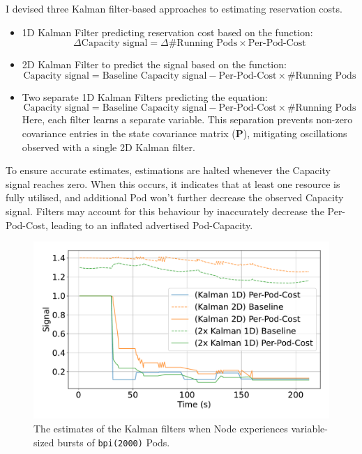 I devised three Kalman filter-based approaches to estimating reservation costs.
\begin{itemize}
    \item 1D Kalman Filter predicting reservation cost based on the function:
        \[\Delta \text{Capacity signal} = \Delta \text{\# Running Pods} \times
        \text{Per-Pod-Cost}\]
    \item 2D Kalman Filter to predict the signal based on the function:
        \[\text{Capacity signal} = \text{Baseline Capacity signal} - \text{Per-Pod-Cost}
        \times \text{\# Running Pods}\]
    \item Two separate 1D Kalman Filters predicting the equation:
        \[\text{Capacity signal} = \text{Baseline Capacity signal} -
        \text{Per-Pod-Cost} \times \text{\# Running Pods}\]
        Here, each filter learns a separate variable. This separation prevents
        non-zero covariance entries in the state covariance matrix ($\mathbf{P}$),
        mitigating oscillations observed with a single 2D Kalman filter.
\end{itemize}
To ensure accurate estimates, estimations are halted whenever the Capacity signal
reaches zero. When this occurs, it indicates that at least one resource is fully
utilised, and additional Pod won't further decrease the observed Capacity
signal. Filters may account for this behaviour by inaccurately decrease the
Per-Pod-Cost, leading to an inflated advertised Pod-Capacity.

\begin{figure}[H]
    \centering
    \includegraphics[width=\textwidth]{images/filter-comparison.pdf}
    \caption{The estimates of the Kalman filters when Node experiences
    variable-sized bursts of \texttt{bpi(2000)} Pods.}
    \label{fig:filter-evaluation}
\end{figure}

